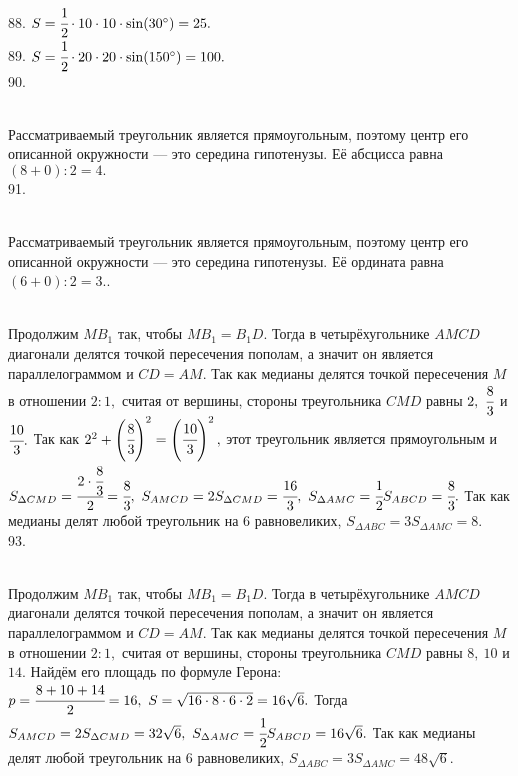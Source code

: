 88. $S=\cfrac{1}{2}\cdot10\cdot10\cdot \sin(30^\circ)=25.$\\
89. $S=\cfrac{1}{2}\cdot20\cdot20\cdot \sin(150^\circ)=100.$\\
90. \begin{figure}[ht!]
\end{figure}\\
Рассматриваемый треугольник является прямоугольным, поэтому центр его описанной окружности --- это середина гипотенузы. Её абсцисса равна $(8+0):2=4.$\\
91. \begin{figure}[ht!]
\end{figure}\\
Рассматриваемый треугольник является прямоугольным, поэтому центр его описанной окружности --- это середина гипотенузы. Её ордината равна $(6+0):2=3.$\newpage{}. \begin{figure}[ht!]
\end{figure}\\
Продолжим $MB_1$ так, чтобы $MB_1=B_1D.$ Тогда в четырёхугольнике $AMCD$ диагонали делятся точкой пересечения пополам, а значит он является параллелограммом и $CD=AM.$ Так как медианы делятся точкой пересечения $M$ в отношении $2:1,$ считая от вершины, стороны треугольника $CMD$ равны $2,\ \cfrac{8}{3}$ и $\cfrac{10}{3}.$ Так как $2^2+\left(\cfrac{8}{3}\right)^2=\left(\cfrac{10}{3}\right)^2,$ этот треугольник является прямоугольным и  $S_{\Delta CMD}=\cfrac{2\cdot\cfrac{8}{3}}{2}=\cfrac{8}{3},\ S_{AMCD}=2S_{\Delta CMD}=\cfrac{16}{3},\ S_{\Delta AMC}=\cfrac{1}{2}S_{ABCD}=\cfrac{8}{3}.$ Так как медианы делят любой треугольник на 6 равновеликих, $S_{\Delta ABC}=3S_{\Delta AMC}=8.$\\
93. \begin{figure}[ht!]
\end{figure}\\
Продолжим $MB_1$ так, чтобы $MB_1=B_1D.$ Тогда в четырёхугольнике $AMCD$ диагонали делятся точкой пересечения пополам, а значит он является параллелограммом и $CD=AM.$ Так как медианы делятся точкой пересечения $M$ в отношении $2:1,$ считая от вершины, стороны треугольника $CMD$ равны $8,\ 10$ и $14.$ Найдём его площадь по формуле Герона: $p=\cfrac{8+10+14}{2}=16,\ S=\sqrt{16\cdot8\cdot6\cdot2}=16\sqrt{6}.$ Тогда $S_{AMCD}=2S_{\Delta CMD}=32\sqrt{6},\ S_{\Delta AMC}=\cfrac{1}{2}S_{ABCD}=16\sqrt{6}.$ Так как медианы делят любой треугольник на 6 равновеликих, $S_{\Delta ABC}=3S_{\Delta AMC}=48\sqrt{6}.$\newpage\noindent
